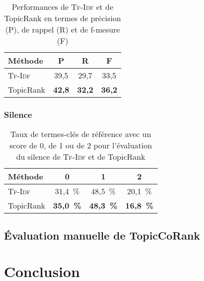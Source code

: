         \begin{table}[h!]
          \centering
          \begin{tabular}{l|ccc}
            \toprule
            \textbf{Méthode} & \textbf{P} & \textbf{R} & \textbf{F}\\
            \hline
            \textsc{Tf-Idf} & 39,5 & 29,7 & 33,5\\
            TopicRank & \textbf{42,8} & \textbf{32,2} & \textbf{36,2}\\
            \bottomrule
          \end{tabular}
          \caption[
            Performances de \textsc{Tf-Idf} et de TopicRank en termes de
            précision, de rappel et de f-mesure
          ]{
            Performances de \textsc{Tf-Idf} et de TopicRank en termes de
            précision (P), de rappel (R) et de f-mesure (F)
            \label{tab:main-automatic_evaluation_of_keyphrase_annotation-results-topicrank-prf}}
        \end{table}
    
      \subsubsection{Silence}
      \label{subsubsec:main-automatic_evaluation_of_keyphrase_annotation-results-topicrank-silence}
        \begin{table}[h!]
          \centering
          \begin{tabular}{l|c|c|c}
            \toprule
            \textbf{Méthode} & \textbf{0} & \textbf{1} & \textbf{2}\\
            \hline
            \textsc{Tf-Idf} & 31,4~\% & 48,5~\% & 20,1~\%\\
            TopicRank & \textbf{35,0~\%} & \textbf{48,3~\%} & \textbf{16,8~\%}\\
            \bottomrule
          \end{tabular}
          \caption{Taux de termes-clés de référence avec un score de 0, de 1 ou
                   de 2 pour l'évaluation du silence de \textsc{Tf-Idf} et de
                   TopicRank
                   \label{tab:main-automatic_evaluation_of_keyphrase_annotation-results-topicrank-silence_score_ratio}}
        \end{table}

    \subsection{Évaluation manuelle de TopicCoRank}
    \label{subsec:main-automatic_evaluation_of_keyphrase_annotation-results-topiccorank}

    \TODO{\dots}


  \section{Conclusion}
  \label{sec:main-automatic_evaluation_of_keyphrase_annotation-Conclusion}

